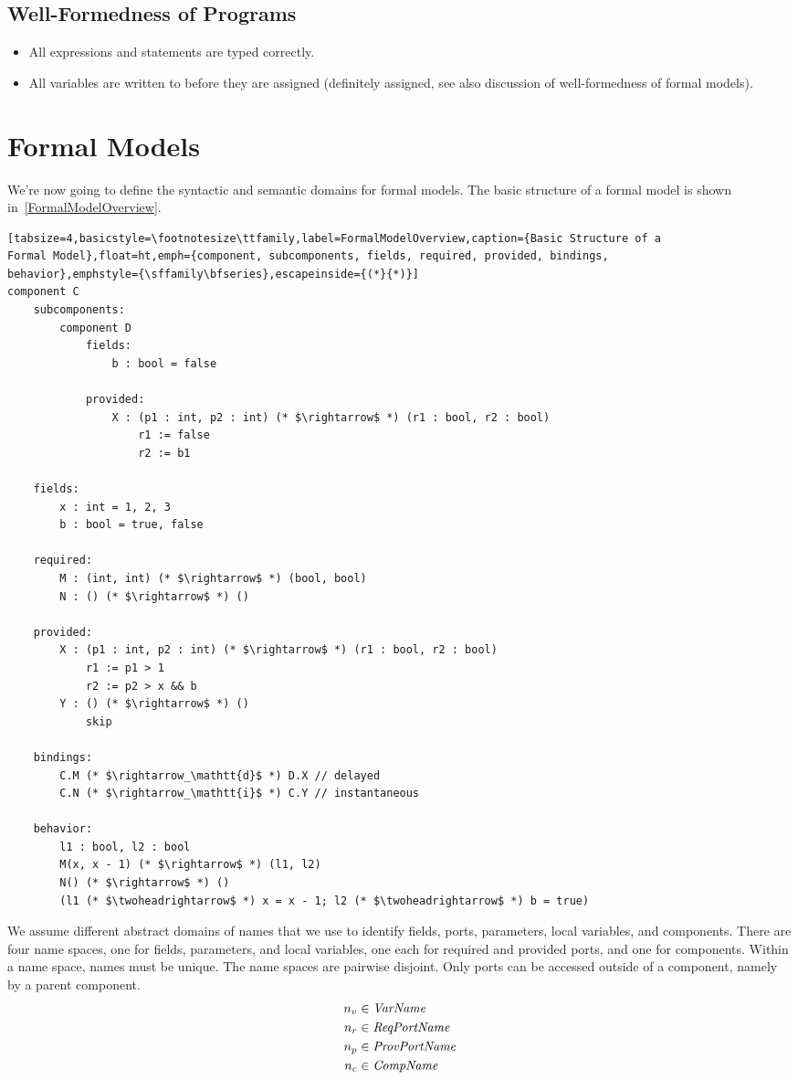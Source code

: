 \documentclass[a4paper,10pt,english]{article}
\begin{document}
\subsection{Well-Formedness of \Fil Programs}
\begin{itemize}
	\item All expressions and statements are typed correctly.
	\item All variables are written to before they are assigned (definitely assigned, see also discussion of well-formedness of
	formal models).
\end{itemize}

\section{Formal Models}
We're now going to define the syntactic and semantic
domains for formal models. The basic structure of a formal model is shown in~\cref{FormalModelOverview}.

\begin{lstlisting}[tabsize=4,basicstyle=\footnotesize\ttfamily,label=FormalModelOverview,caption={Basic Structure of a
Formal Model},float=ht,emph={component, subcomponents, fields, required, provided, bindings,
behavior},emphstyle={\sffamily\bfseries},escapeinside={(*}{*)}]
component C
	subcomponents:
		component D
			fields:
				b : bool = false
				
			provided:
				X : (p1 : int, p2 : int) (* $\rightarrow$ *) (r1 : bool, r2 : bool)
					r1 := false
					r2 := b1

	fields:
		x : int = 1, 2, 3
		b : bool = true, false
		
	required:
		M : (int, int) (* $\rightarrow$ *) (bool, bool)
		N : () (* $\rightarrow$ *) ()
		
	provided:
		X : (p1 : int, p2 : int) (* $\rightarrow$ *) (r1 : bool, r2 : bool)
			r1 := p1 > 1
			r2 := p2 > x && b
		Y : () (* $\rightarrow$ *) ()
			skip
		
	bindings:
		C.M (* $\rightarrow_\mathtt{d}$ *) D.X // delayed
		C.N (* $\rightarrow_\mathtt{i}$ *) C.Y // instantaneous
	
	behavior:
		l1 : bool, l2 : bool
		M(x, x - 1) (* $\rightarrow$ *) (l1, l2)
		N() (* $\rightarrow$ *) ()
		(l1 (* $\twoheadrightarrow$ *) x = x - 1; l2 (* $\twoheadrightarrow$ *) b = true)
\end{lstlisting}

We assume different abstract domains of names that we use to identify fields, ports, parameters, local variables, and components.
There are four name spaces, one for fields, parameters, and local variables, one each for required and provided ports, and one for
components. Within a name space, names must be unique. The name spaces are pairwise disjoint. Only ports can be accessed
outside of a component, namely by a parent component. 
\begin{align*}
	n_v &\in \mathit{VarName} \\
	n_r &\in \mathit{ReqPortName} \\
	n_p &\in \mathit{ProvPortName} \\
	n_c &\in \mathit{CompName}
\end{align*}
\end{document}
